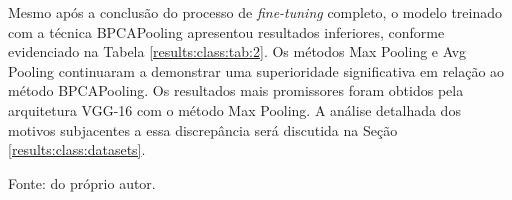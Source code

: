 Mesmo após a conclusão do processo de \textit{fine-tuning} completo, o modelo treinado com a técnica BPCAPooling apresentou resultados inferiores, conforme evidenciado na Tabela \ref{results:class:tab:2}. Os métodos Max Pooling e Avg Pooling continuaram a demonstrar uma superioridade significativa em relação ao método BPCAPooling. Os resultados mais promissores foram obtidos pela arquitetura VGG-16 com o método Max Pooling. A análise detalhada dos motivos subjacentes a essa discrepância será discutida na Seção \ref{results:class:datasets}.

\begin{table}[H]
    \centering
    \caption{Resultados por fase de \textit{fine-tuning} de VGG-16 aplicada no conjunto de dados CIFAR 100.}
    \label{results:class:tab:2}

    \vspace*{1 cm}
    Fonte: do próprio autor.
\end{table}


